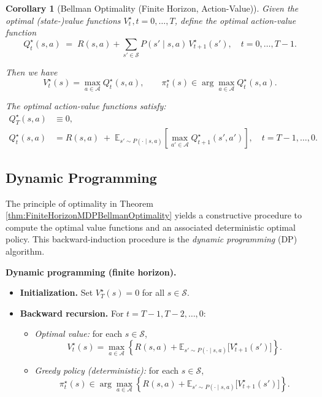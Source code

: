 \documentclass[
]{book}
\newtheorem{corollary}{Corollary}[chapter]
\theoremstyle{definition}
\theoremstyle{definition}
\theoremstyle{definition}
\theoremstyle{definition}
\theoremstyle{remark}
\begin{document}
\begin{corollary}[Bellman Optimality (Finite Horizon, Action-Value)]
\protect\hypertarget{cor:FiniteHorizonMDPBellmanOptimalityActionValue}{}\label{cor:FiniteHorizonMDPBellmanOptimalityActionValue}Given the optimal (state-)value functions \(V^{\star}_{t},t=0,\dots,T\), define the optimal action-value function
\begin{equation}
Q_t^\star(s,a)\;=\;R(s,a)+\sum_{s'\in\mathcal{S}} P(s'\mid s,a)\,V_{t+1}^\star(s'), \quad t=0,\dots,T-1.
\label{eq:FiniteHorizonMDPOptimalActionValue}
\end{equation}

Then we have
\begin{equation}
V_t^\star(s)=\max_{a\in\mathcal{A}} Q_t^\star(s,a),\qquad
\pi_t^\star(s)\in\arg\max_{a\in\mathcal{A}} Q_t^\star(s,a).
\label{eq:FiniteHorizonMDPStateValueActionValue}
\end{equation}

The optimal action-value functions satisfy:
\begin{equation}
\begin{split}
Q_T^\star(s,a) & \equiv 0,\\
Q_t^\star(s,a)
& = R(s,a) \;+\; \mathbb{E}_{s'\sim P(\cdot\mid s,a)}
\!\left[ \max_{a'\in\mathcal{A}} Q_{t+1}^\star(s',a') \right],
\quad t=T-1,\ldots,0.
\end{split}
\label{eq:FiniteHorizonMDPBellmanRecursionActionValue}
\end{equation}
\end{corollary}

\subsection{Dynamic Programming}\label{dp}

The principle of optimality in Theorem \ref{thm:FiniteHorizonMDPBellmanOptimality} yields a constructive procedure to compute the optimal value functions and an associated deterministic optimal policy. This backward-induction procedure is the \emph{dynamic programming} (DP) algorithm.

\textbf{Dynamic programming (finite horizon).}

\begin{itemize}
\item
  \textbf{Initialization.} Set \(V_T^\star(s) = 0\) for all \(s \in \mathcal{S}\).
\item
  \textbf{Backward recursion.} For \(t = T-1, T-2, \dots, 0\):

  \begin{itemize}
  \item
    \emph{Optimal value:} for each \(s \in \mathcal{S}\),
    \[
    V_t^\star(s)
    = \max_{a \in \mathcal{A}}
    \left\{
    R(s,a) + \mathbb{E}_{s' \sim P(\cdot \mid s,a)} \big[ V_{t+1}^\star(s') \big]
    \right\}.
    \]
  \item
    \emph{Greedy policy (deterministic):} for each \(s \in \mathcal{S}\),
    \[
    \pi_t^\star(s) \in \arg\max_{a \in \mathcal{A}}
    \left\{
    R(s,a) + \mathbb{E}_{s' \sim P(\cdot \mid s,a)} \big[ V_{t+1}^\star(s') \big]
    \right\}.
    \]
  \end{itemize}
\end{itemize}
\end{document}
